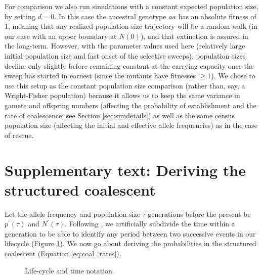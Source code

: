 \documentclass[]{article}
\begin{document}
For comparison we also run simulations with a constant expected population size, by setting $d=0$.
In this case the ancestral genotype $aa$ has an absolute fitness of 1, meaning that any realized population size trajectory will be a random walk (in our case with an upper boundary at $N(0)$), and that extinction is assured in the long-term.  
However, with the parameter values used here (relatively large initial population size and fast onset of the selective sweeps), population sizes decline only slightly before remaining constant at the carrying capacity once the sweep has started in earnest (since the mutants have fitnesses $\geq 1$).
We chose to use this setup as the constant population size comparison (rather than, say, a Wright-Fisher population) because it allows us to keep the same variance in gamete and offspring numbers (affecting the probability of establishment and the rate of coalescence; see Section \ref{sec:simdetails}) as well as the same census population size (affecting the initial and effective allele frequencies) as in the case of rescue.

\section*{Supplementary text: Deriving the structured coalescent}
\label{sec:derive_coalescent}
%
Let the allele frequency and population size $\tau$ generations before the present be $p^\prime(\tau)$ and $N^\prime(\tau)$.
Following \cite{pennings2006soft2}, we artificially subdivide the time within a generation to be able to identify any period between two successive events in our lifecycle (Figure \ref{fig:lifecycle}).
We now go about deriving the probabilities in the structured coalescent (Equation \ref{eq:coal_rates}).
%
\begin{figure}[!htbp]
\centering
{}
\caption{
Life-cycle and time notation.
}%
\label{fig:lifecycle}
\end{figure}
%
\end{document}
